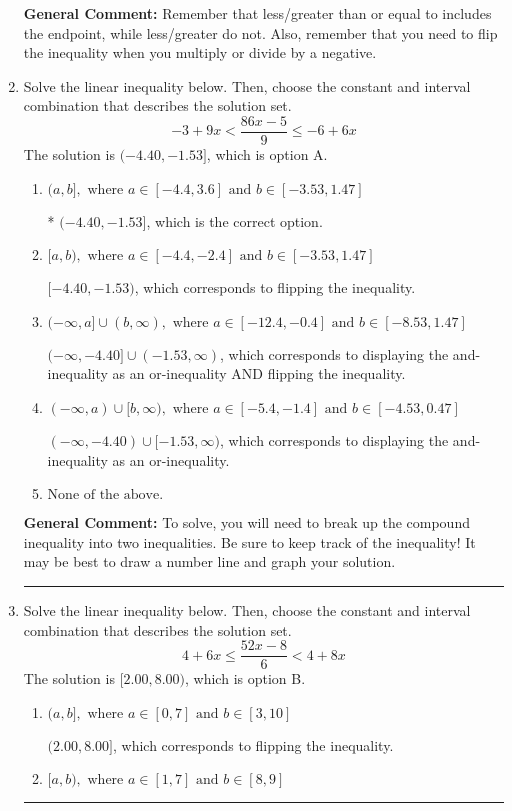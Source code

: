 \documentclass{extbook}[14pt]
\newcommand{\litem}[1]{\item #1

\rule{\textwidth}{0.4pt}}
\begin{document}
\begin{enumerate}
{\textbf{General Comment:} Remember that less/greater than or equal to includes the endpoint, while less/greater do not. Also, remember that you need to flip the inequality when you multiply or divide by a negative.
}
\litem{
Solve the linear inequality below. Then, choose the constant and interval combination that describes the solution set.
\[ -3 + 9 x < \frac{86 x - 5}{9} \leq -6 + 6 x \]
The solution is \( (-4.40, -1.53] \), which is option A.\begin{enumerate}[label=\Alph*.]
\item \( (a, b], \text{ where } a \in [-4.4, 3.6] \text{ and } b \in [-3.53, 1.47] \)

* $(-4.40, -1.53]$, which is the correct option.
\item \( [a, b), \text{ where } a \in [-4.4, -2.4] \text{ and } b \in [-3.53, 1.47] \)

$[-4.40, -1.53)$, which corresponds to flipping the inequality.
\item \( (-\infty, a] \cup (b, \infty), \text{ where } a \in [-12.4, -0.4] \text{ and } b \in [-8.53, 1.47] \)

$(-\infty, -4.40] \cup (-1.53, \infty)$, which corresponds to displaying the and-inequality as an or-inequality AND flipping the inequality.
\item \( (-\infty, a) \cup [b, \infty), \text{ where } a \in [-5.4, -1.4] \text{ and } b \in [-4.53, 0.47] \)

$(-\infty, -4.40) \cup [-1.53, \infty)$, which corresponds to displaying the and-inequality as an or-inequality.
\item \( \text{None of the above.} \)


\end{enumerate}

\textbf{General Comment:} To solve, you will need to break up the compound inequality into two inequalities. Be sure to keep track of the inequality! It may be best to draw a number line and graph your solution.
}
\litem{
Solve the linear inequality below. Then, choose the constant and interval combination that describes the solution set.
\[ 4 + 6 x \leq \frac{52 x - 8}{6} < 4 + 8 x \]
The solution is \( [2.00, 8.00) \), which is option B.\begin{enumerate}[label=\Alph*.]
\item \( (a, b], \text{ where } a \in [0, 7] \text{ and } b \in [3, 10] \)

$(2.00, 8.00]$, which corresponds to flipping the inequality.
\item \( [a, b), \text{ where } a \in [1, 7] \text{ and } b \in [8, 9] \)


\end{enumerate}}
\end{enumerate}
\end{document}
